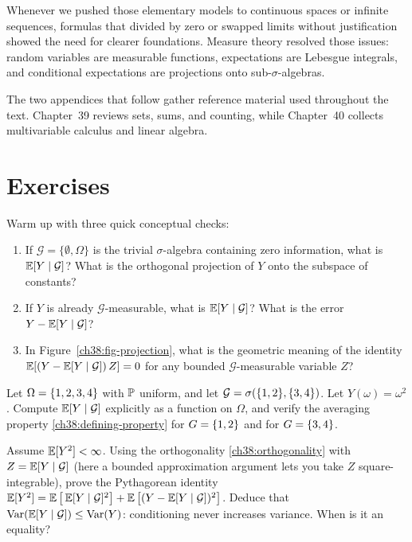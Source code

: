 Whenever we pushed those elementary models to continuous spaces or infinite
sequences, formulas that divided by zero or swapped limits without justification
showed the need for clearer foundations. Measure theory resolved those issues:
random variables are measurable functions, expectations are Lebesgue integrals,
and conditional expectations are projections onto sub-$\sigma$-algebras.

The two appendices that follow gather reference material used throughout the text.
Chapter~39 reviews sets, sums, and counting, while
Chapter~40 collects multivariable calculus and linear algebra.

\section{Exercises}
\label{ch38:exercises}

\begin{exercise}
\label{ch38:ex-warmup}
Warm up with three quick conceptual checks:
\begin{enumerate}
  \item If $\mathcal{G} = \{\emptyset, \Omega\}$ is the trivial $\sigma$-algebra containing zero information, what is $\E[Y \given \mathcal{G}]$? What is the orthogonal projection of $Y$ onto the subspace of constants?
  \item If $Y$ is already $\mathcal{G}$-measurable, what is $\E[Y \given \mathcal{G}]$? What is the error $Y - \E[Y \given \mathcal{G}]$?
  \item In Figure~\ref{ch38:fig-projection}, what is the geometric meaning of the identity $\E[(Y - \E[Y\given\mathcal{G}])\,Z] = 0$ for any bounded $\mathcal{G}$-measurable variable $Z$?
\end{enumerate}
\end{exercise}

\begin{exercise}
\label{ch38:ex-def}
Let $\Omega = \set{1,2,3,4}$ with $\P$ uniform, and let $\mathcal{G} = \sigma(\set{1,2}, \set{3,4})$.
Let $Y(\omega) = \omega^2$. Compute $\E[Y\given\mathcal{G}]$ explicitly as a function on $\Omega$, and
verify the averaging property \eqref{ch38:defining-property} for $G = \set{1,2}$ and for $G =
\set{3,4}$.
\end{exercise}

\begin{exercise}
\label{ch38:ex-variance}
Assume $\E[Y^2] < \infty$. Using the orthogonality \eqref{ch38:orthogonality} with
$Z = \E[Y\given\mathcal{G}]$ (here a bounded approximation argument lets you take $Z$ square-integrable),
prove the
Pythagorean identity $\E[Y^2] = \E\big[\E[Y\given\mathcal{G}]^2\big] +
\E\big[(Y - \E[Y\given\mathcal{G}])^2\big]$. Deduce that $\Var(\E[Y\given\mathcal{G}]) \le \Var(Y)$:
conditioning never increases variance. When is it an equality?
\end{exercise}

